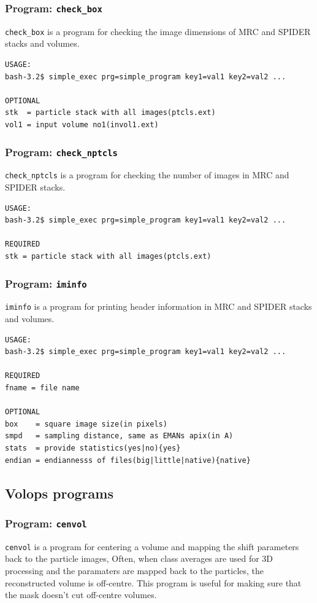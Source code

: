 \documentclass[a4paper,11pt]{article}
\newcommand{\prgname}[1]{\textcolor{NavyBlue}{\texttt{#1}}}
\begin{document}
\subsubsection{Program: \prgname{check\_box}}
\label{check_box}
\prgname{check\_box} is a program for checking the image dimensions of MRC and SPIDER stacks and volumes.

\begin{verbatim}
USAGE:
bash-3.2$ simple_exec prg=simple_program key1=val1 key2=val2 ...

OPTIONAL
stk  = particle stack with all images(ptcls.ext)
vol1 = input volume no1(invol1.ext)
\end{verbatim}

\subsubsection{Program: \prgname{check\_nptcls}}
\label{check_nptcls}
\prgname{check\_nptcls} is a program for checking the number of images in MRC and SPIDER stacks.

\begin{verbatim}
USAGE:
bash-3.2$ simple_exec prg=simple_program key1=val1 key2=val2 ...

REQUIRED
stk = particle stack with all images(ptcls.ext)
\end{verbatim}

\subsubsection{Program: \prgname{iminfo}}
\label{iminfo}
\prgname{iminfo} is a program for printing header information in MRC and SPIDER stacks and volumes.

\begin{verbatim}
USAGE:
bash-3.2$ simple_exec prg=simple_program key1=val1 key2=val2 ...

REQUIRED
fname = file name

OPTIONAL
box    = square image size(in pixels)
smpd   = sampling distance, same as EMANs apix(in A)
stats  = provide statistics(yes|no){yes}
endian = endiannesss of files(big|little|native){native}
\end{verbatim}

\subsection{Volops programs}

\subsubsection{Program: \prgname{cenvol}}
\label{cenvol}
\prgname{cenvol} is a program for centering a volume and mapping the shift parameters back to the particle images, Often, when class averages are used for 3D processing and the paramaters are mapped back to the particles, the reconstructed volume is off-centre. This program is useful for making sure that the mask doesn't cut off-centre volumes.
\end{document}
